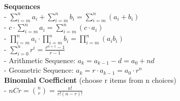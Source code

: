\documentclass[10pt,letterpaper]{article}
\begin{document}
\begin{multicols}{2}
\textbf{Sequences}\\
- $\sum_{i=m}^{n} a_i + \sum_{i=m}^{n} b_i = \sum_{i=m}^{n}(a_i + b_i)$\\
- $c \cdot \sum_{i=m}^{n} a_i = \sum_{i=m}^{n}(c \cdot a_i)$\\
- $\prod_{i=m}^{n} a_i \cdot \prod_{i=m}^{n} b_i = \prod_{i=m}^{n}(a_ib_i)$\\
- $\sum_{i=0}^{n} r^i = \frac{r^{n+1} - 1}{r - 1}$\\
- Arithmetic Sequence: $a_k = a_{k-1} - d = a_0 + nd$\\
- Geometric Sequence: $a_k = r \cdot a_{k-1} = a_0 \cdot r^n$\\
\textbf{Binomial Coefficient} (choose r items from n choices)\\
- $nCr = \binom{n}{r} = \frac{n!}{r!(n-r)!}$\\

\vspace{9999pt}

\end{multicols}
\end{document}
